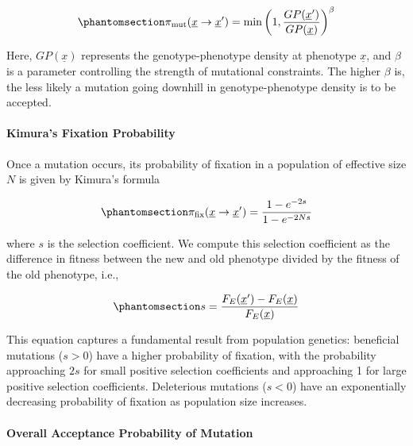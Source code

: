 \documentclass[
]{scrartcl}
\let\oldparagraph\paragraph
\renewcommand{\paragraph}[1]{\oldparagraph{#1}\mbox{}}
\begin{document}
\begin{equation}\phantomsection\label{eq-mutation-probability}{
\pi_{\text{mut}}(\underline{x} \to \underline{x}') = 
\min\left(1, \frac{GP(\underline{x}')}{GP(\underline{x})}\right)^{\beta}
}\end{equation}

Here, \(GP(\underline{x})\) represents the genotype-phenotype density at
phenotype \(\underline{x}\), and \(\beta\) is a parameter controlling
the strength of mutational constraints. The higher \(\beta\) is, the
less likely a mutation going downhill in genotype-phenotype density is
to be accepted.

\paragraph{Kimura's Fixation
Probability}\label{kimuras-fixation-probability}

Once a mutation occurs, its probability of fixation in a population of
effective size \(N\) is given by Kimura's formula

\begin{equation}\phantomsection\label{eq-kimura-fixation-probability}{
\pi_{\text{fix}}(\underline{x} \to \underline{x}') = 
\frac{1 - e^{-2s}}{1 - e^{-2Ns}}
}\end{equation}

where \(s\) is the selection coefficient. We compute this selection
coefficient as the difference in fitness between the new and old
phenotype divided by the fitness of the old phenotype, i.e.,

\begin{equation}\phantomsection\label{eq-selection-coefficient}{
s = \frac{F_E(\underline{x}') - F_E(\underline{x})}{F_E(\underline{x})}
}\end{equation}

This equation captures a fundamental result from population genetics:
beneficial mutations (\(s > 0\)) have a higher probability of fixation,
with the probability approaching \(2s\) for small positive selection
coefficients and approaching 1 for large positive selection
coefficients. Deleterious mutations (\(s < 0\)) have an exponentially
decreasing probability of fixation as population size increases.

\paragraph{Overall Acceptance Probability of
Mutation}\label{overall-acceptance-probability-of-mutation}
\end{document}
